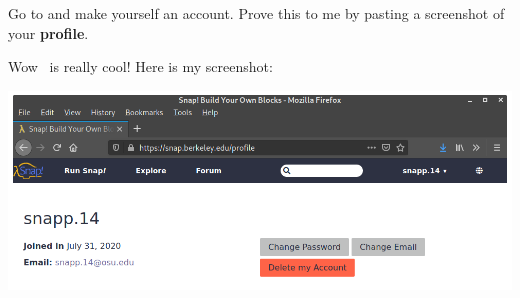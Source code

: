 \documentclass[nooutcomes,noauthor,handout]{ximera}
\begin{document}
\begin{question}
  Go to \flavor and make yourself an account. Prove this to me by
  pasting a screenshot of your \textbf{profile}.
  \begin{freeResponse}
    Wow \snap\ is really cool! Here is my screenshot:
    \begin{center}
      \includegraphics[width=.4\textwidth]{profile.png}
    \end{center}
  \end{freeResponse}
\end{question}
\end{document}
